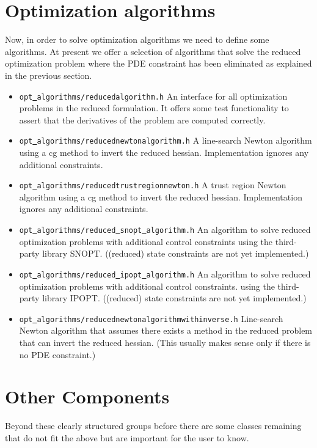 \section{Optimization algorithms}
Now, in order to solve optimization algorithms we need to define some algorithms.
At present we offer a selection of algorithms that solve the reduced optimization 
problem where the PDE constraint has been eliminated as explained in the previous section.
\begin{itemize}
\item \texttt{opt\underline{ }algorithms/reducedalgorithm.h} An interface for all 
  optimization problems in the reduced formulation. It offers some test functionality
  to assert that the derivatives of the problem are computed correctly.
\item \texttt{opt\underline{ }algorithms/reducednewtonalgorithm.h}
  A line-search Newton algorithm using a cg method to invert the reduced hessian. 
  Implementation ignores any additional constraints.
\item \texttt{opt\underline{ }algorithms/reducedtrustregionnewton.h}
  A trust region Newton algorithm using a cg method to invert the reduced hessian.
  Implementation ignores any additional constraints.
\item \texttt{opt\underline{ }algorithms/reduced\underline{ }snopt\underline{ }algorithm.h}
  An algorithm to solve reduced optimization problems with additional control constraints
  using the third-party library SNOPT.
  ((reduced) state constraints are not yet implemented.)
\item \texttt{opt\underline{ }algorithms/reduced\underline{ }ipopt\underline{ }algorithm.h}
  An algorithm to solve reduced optimization problems with additional control constraints.
  using the third-party library IPOPT.
  ((reduced) state constraints are not yet implemented.)
\item \texttt{opt\underline{ }algorithms/reducednewtonalgorithmwithinverse.h}
  Line-search Newton algorithm that assumes there exists a method in the reduced problem
  that can invert the reduced hessian. (This usually makes sense only if there is no 
  PDE constraint.)
\end{itemize} 

\section{Other Components}
Beyond these clearly structured groups before there are some classes remaining that
do not fit the above but are important for the user to know.



